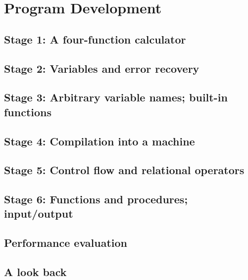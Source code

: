 \chapter{Program Development}
\label{chap:program_development}
\section{Stage 1: A four-function calculator}
\section{Stage 2: Variables and error recovery}
\section{Stage 3: Arbitrary variable names; built-in functions}
\section{Stage 4: Compilation into a machine}
\section{Stage 5: Control flow and relational operators}
\section{Stage 6: Functions and procedures; input/output}
\section{Performance evaluation}
\section{A look back}
